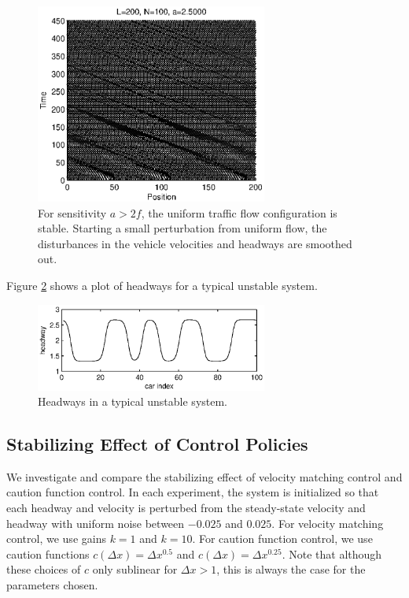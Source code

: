 \documentclass[10pt,twocolumn]{article}
\theoremstyle{ss}
\begin{document}
\begin{figure}[!h]
\begin{center}
\includegraphics[width=3in]{smoothed}
\end{center}
\caption{ \label{fig:smoothed} For sensitivity $a>2f$, the uniform traffic flow configuration is stable. Starting a small perturbation from uniform flow, the disturbances in the vehicle velocities and headways are smoothed out.}
\end{figure}

Figure \ref{fig:typinst} shows a plot of headways for a typical unstable system.

\begin{figure}[!h]
\begin{center}
\includegraphics[width=3in]{typinst}
\end{center}
\caption{ \label{fig:typinst} Headways in a typical unstable system.}
\end{figure}

\subsection{Stabilizing Effect of Control Policies}
We investigate and compare the stabilizing effect of velocity matching control and caution function control. In each experiment, the system is initialized so that each headway and velocity is perturbed from the steady-state velocity and headway with uniform noise between $-0.025$ and $0.025$. For velocity matching control, we use gains $k=1$ and $k=10$. For caution function control, we use caution functions $c(\Delta x) = \Delta x^{0.5}$ and $c(\Delta x) = \Delta x^{0.25}$. Note that although these choices of $c$ only sublinear for $\Delta x > 1$, this is always the case for the parameters chosen.
\end{document}
